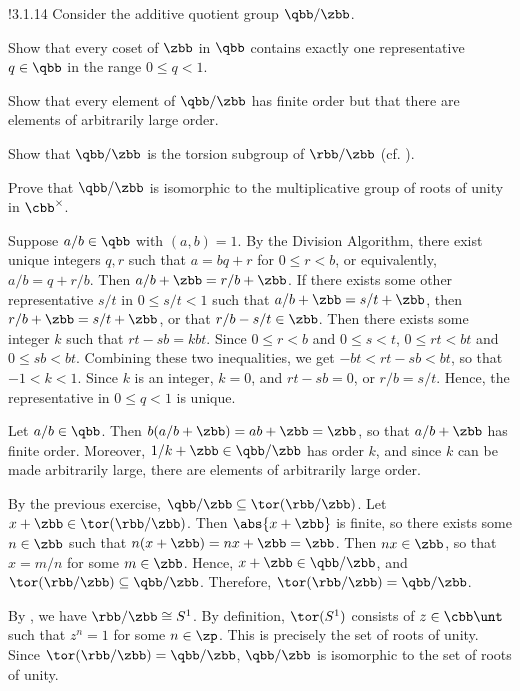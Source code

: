 \begin{exercise}!{3.1.14}
    Consider the additive quotient group $\qbb/\zbb$.
    \begin{subexercises}
        \item Show that every coset of $\zbb$ in $\qbb$ contains exactly one representative $q \in \qbb$ in the range $0 \leq q < 1$.
        \item Show that every element of $\qbb/\zbb$ has finite order but that there are elements of arbitrarily large order.
        \item Show that $\qbb/\zbb$ is the torsion subgroup of $\rbb/\zbb$ (cf. ).
        \item Prove that $\qbb/\zbb$ is isomorphic to the multiplicative group of roots of unity in $\cbb^\times$.
    \end{subexercises}
\end{exercise}

\begin{solenum}
    \item Suppose $a/b \in \qbb$ with $(a, b) = 1$.
	By the Division Algorithm, there exist unique integers $q, r$ such that $a = bq + r$ for $0 \leq r < b$, or equivalently, $a/b = q + r/b$.
	Then $a/b + \zbb = r/b + \zbb$.
	If there exists some other representative $s/t$ in $0 \leq s/t < 1$ such that $a/b + \zbb = s/t + \zbb$, then $r/b + \zbb = s/t + \zbb$, or that $r/b - s/t \in \zbb$.
	Then there exists some integer $k$ such that $rt - sb = kbt$.
	Since $0 \leq r < b$ and $0 \leq s < t$, $0 \leq rt < bt$ and $0 \leq sb < bt$.
	Combining these two inequalities, we get $-bt < rt - sb < bt$, so that $-1 < k < 1$.
	Since $k$ is an integer, $k = 0$, and $rt - sb = 0$, or $r/b = s/t$.
	Hence, the representative in $0 \leq q < 1$ is unique.
    \item Let $a/b \in \qbb$.
	Then $b(a/b + \zbb) = ab + \zbb = \zbb$, so that $a/b + \zbb$ has finite order.
	Moreover, $1/k + \zbb \in \qbb/\zbb$ has order $k$, and since $k$ can be made arbitrarily large, there are elements of arbitrarily large order.
    \item By the previous exercise, $\qbb/\zbb \subseteq \tor(\rbb/\zbb)$.
	Let $x + \zbb \in \tor(\rbb/\zbb)$.
	Then $\abs{x + \zbb}$ is finite, so there exists some $n \in \zbb$ such that $n(x + \zbb) = nx + \zbb = \zbb$.
	Then $nx \in \zbb$, so that $x = m/n$ for some $m \in \zbb$.
	Hence, $x + \zbb \in \qbb/\zbb$, and $\tor(\rbb/\zbb) \subseteq \qbb/\zbb$.
	Therefore, $\tor(\rbb/\zbb) = \qbb/\zbb$.
    \item By , we have $\rbb/\zbb \cong S^1$.
	By definition, $\tor(S^1)$ consists of $z \in \cbb\unt$ such that $z^n = 1$ for some $n \in \zp$.
	This is precisely the set of roots of unity.
	Since $\tor(\rbb/\zbb) = \qbb/\zbb$, $\qbb/\zbb$ is isomorphic to the set of roots of unity.
\end{solenum}


